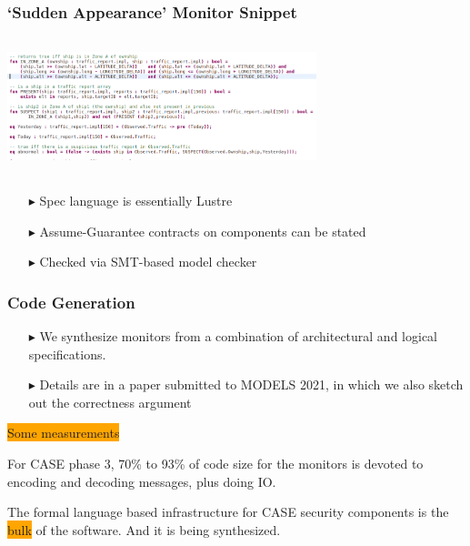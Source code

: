 \documentclass{beamer}
\newcommand{\kemph}[1]{\colorbox{orange}{#1}}
\begin{document}
\begin{frame}\frametitle{`Sudden Appearance' Monitor Snippet}

\hspace*{10mm}\includegraphics[width=90mm,height=40mm]{monitor.png}

\begin{itemize}
\item [$\blacktriangleright$] Spec language is essentially Lustre
\item [$\blacktriangleright$] Assume-Guarantee contracts on components can be stated
\item [$\blacktriangleright$] Checked via SMT-based model checker
\end{itemize}

\end{frame}

\begin{frame}\frametitle{Code Generation}

\begin{itemize}
\item [$\blacktriangleright$] We synthesize monitors from a combination of architectural and
logical specifications.
\item [$\blacktriangleright$] Details are in a paper submitted to
  MODELS 2021, in which we also sketch out the correctness argument

\end{itemize}

\vspace*{5mm}

\kemph{Some measurements}

\vspace*{3mm}

For CASE phase 3, 70\% to 93\% of code size
for the monitors is devoted to encoding and decoding messages, plus
doing IO.

\vspace*{4mm}

The formal language based infrastructure for CASE security components
is the \kemph{bulk} of the software. And it is being synthesized.

\end{frame}
\end{document}
